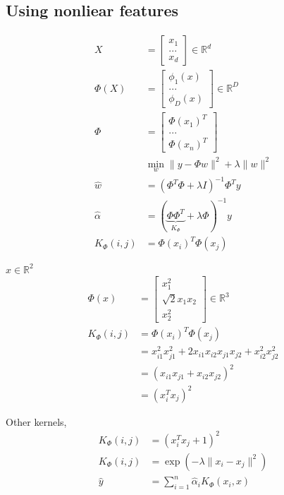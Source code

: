 \documentclass{article}
\begin{document}
\subsection{Using nonliear features}
\begin{align*}
X  &= \begin{bmatrix} x_{1} \\ ... \\ x_{d} \end{bmatrix} \in \mathbb{R}^{d}
\\ \Phi\left(X\right) &= \begin{bmatrix} \phi_{1}\left(x\right) \\ ... \\ \phi_{D}\left(x\right) \end{bmatrix} \in \mathbb{R}^{D}
\\ \Phi &= \begin{bmatrix} \Phi\left(x_{1}\right)^{T} \\ ... \\ \Phi\left(x_{n}\right)^{T} \end{bmatrix}
\\ &  \displaystyle\min_{w} \| y - \Phi w \|^{2} + \lambda \| w \|^{2}
\\ \hat{w} &= \left(\Phi^{T} \Phi + \lambda I\right)^{-1} \Phi^{T} y 
\\ \hat{\alpha} &= \left(\underbrace{\Phi \Phi^{T}}_{K_{\Phi}} + \lambda \Phi\right)^{-1} y 
\\ K_{\Phi} \left(i, j\right) &= \Phi\left(x_{i}\right)^{T} \Phi\left(x_{j}\right)
\end{align*}
\begin{eg} \label{eg:ph1} 
$x  \in \mathbb{R}^{2}$
\begin{align*}
\Phi\left(x\right) &= \begin{bmatrix} x_{1}^{2} \\ \sqrt{2} x_{1} x_{2} \\ x_{2}^{2} \end{bmatrix} \in \mathbb{R}^{3}
\\ K_{\Phi} \left(i, j\right) &= \Phi\left(x_{i}\right)^{T} \Phi\left(x_{j}\right)
\\ &= x_{i1}^{2} x_{j1}^{2} + 2 x_{i1} x_{i2} x_{j1} x_{j2} + x_{i2}^{2} x_{j2}^{2}
\\ &= \left(x_{i1} x_{j1} + x_{i2} x_{j2}\right)^{2}
\\ &= \left(x_{i}^{T} x_{j}\right)^{2}
\end{align*}\end{eg}
\begin{eg} \label{eg:ph2} 
Other kernels,
\begin{align*}
K_{\Phi} \left(i, j\right) &= \left(x_{i}^{T} x_{j} + 1\right)^{2}
\\ K_{\Phi} \left(i, j\right) &= \exp\left(-\lambda \| x_{i} - x_{j} \|^{2}\right)
\\ \hat{y} &= \displaystyle\sum_{i=1}^{n} \hat{\alpha}_{i} K_{\Phi} \left(x_{i}, x \right)
\end{align*}\end{eg}
\end{document}
